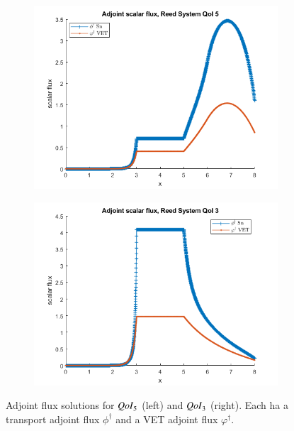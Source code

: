 \documentclass{anstrans}
\newcommand{\qoi}{{\it QoI}\xspace}
\begin{document}
\begin{figure}
\centering
\begin{subfigure}{.25\textwidth}
  \centering
  \includegraphics[width=.98\linewidth]{774phia.png}
\end{subfigure}%
\begin{subfigure}{.25\textwidth}
  \centering
  \includegraphics[width=.98\linewidth]{772phia.png}
\end{subfigure}
\caption{Adjoint flux solutions for $\qoi_5$ (left) and $\qoi_3$ (right). Each ha a transport adjoint flux $\phi^\dag$ and a VET adjoint flux $\varphi^\dag$.}
\label{fig:adj}
\end{figure}
\end{document}
